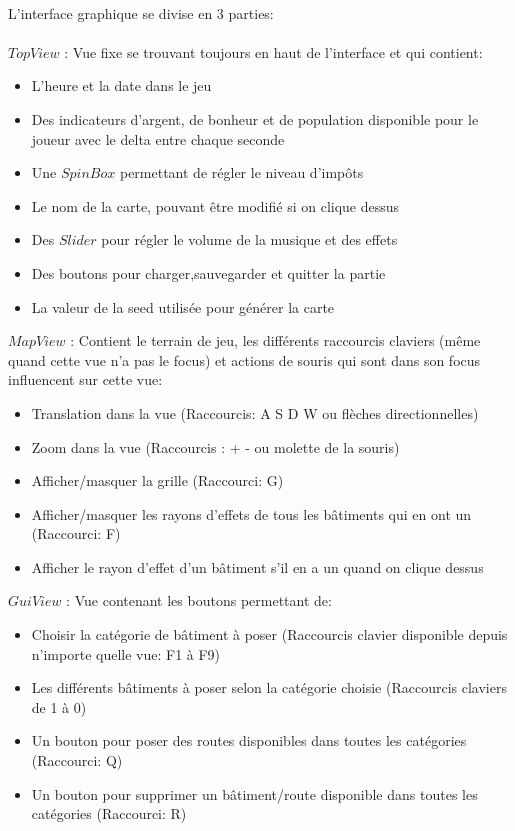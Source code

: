 \documentclass[a4paper,10pt,openany,oneside]{report}
\begin{document}
\paragraph{}
L'interface graphique se divise en 3 parties:\\\\
$TopView$ : Vue fixe se trouvant toujours en haut de l'interface et qui contient:
\begin{itemize}
\item L'heure et la date dans le jeu
\item Des indicateurs d'argent, de bonheur et de population disponible pour le joueur avec le delta entre chaque seconde
\item Une $SpinBox$ permettant de régler le niveau d'impôts
\item Le nom de la carte, pouvant être modifié si on clique dessus
\item Des $Slider$ pour régler le volume de la musique et des effets
\item Des boutons pour charger,sauvegarder et quitter la partie
\item La valeur de la seed utilisée pour générer la carte
\end{itemize}
$MapView$ : Contient le terrain de jeu, les différents raccourcis claviers (même quand cette vue n'a pas le focus) et actions de souris qui sont dans son focus influencent sur cette vue:
\begin{itemize}
\item Translation dans la vue (Raccourcis: A S D W ou flèches directionnelles)
\item Zoom dans la vue (Raccourcis : + - ou molette de la souris)
\item Afficher/masquer la grille (Raccourci: G)
\item Afficher/masquer les rayons d'effets de tous les bâtiments qui en ont un (Raccourci: F)
\item Afficher le rayon d'effet d'un bâtiment s'il en a un quand on clique dessus
\end{itemize}
$GuiView$ : Vue contenant les boutons permettant de:
\begin{itemize}
\item Choisir la catégorie de bâtiment à poser (Raccourcis clavier disponible depuis n'importe quelle vue: F1 à F9)
\item Les différents bâtiments à poser selon la catégorie choisie (Raccourcis claviers de 1 à 0)
\item Un bouton pour poser des routes disponibles dans toutes les catégories (Raccourci: Q)
\item Un bouton pour supprimer un bâtiment/route disponible dans toutes les catégories (Raccourci: R)
\end{itemize}
\end{document}
